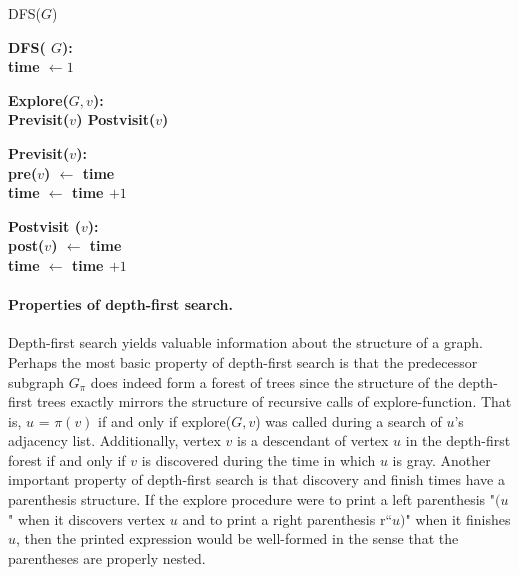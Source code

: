   \begin{algorithm}
  \caption{DFS($G$)}
   \bf{DFS}( $G$): \\
    time $ \leftarrow 1 $\\

  \end{algorithm}

  \begin{algorithm}[H]
    \bf{Explore}($G,v$): \\
     Previsit($v$)
    Postvisit($v$)
  \end{algorithm}
  \begin{algorithm}[H]
    \bf{Previsit}($v$): \\
    pre($v$) $\leftarrow $ time \\
    time $\leftarrow$ time $+1$
  \end{algorithm}
  \begin{algorithm}[H]
   \bf{Postvisit} ($v$): \\ 
    post($v$) $\leftarrow $ time \\
    time $\leftarrow$ time $+1$
  \end{algorithm}


\paragraph{Properties of depth-first search.} Depth-first search yields valuable information about the structure of a graph. Perhaps the most basic property of depth-first search is that the predecessor subgraph $G_{\pi}$ does indeed form a forest of trees since the structure of the depth-first trees exactly mirrors the structure of recursive calls of explore-function. That is, $u$ = $\pi\left( v \right)$ if and only if explore($G, v$) was called during a search of $ u$'s adjacency list. Additionally, vertex $v$ is a descendant of vertex $u$ in the depth-first forest if and only if $v$ is discovered during the time in which $u$ is gray.
Another important property of depth-first search is that discovery and finish times have a parenthesis structure. If the explore procedure were to print a left parenthesis "$(u$" when it discovers vertex $u$ and to print a right parenthesis r``$u)$" when it finishes $u$, then the printed expression would be well-formed in the sense that the parentheses are properly nested.

